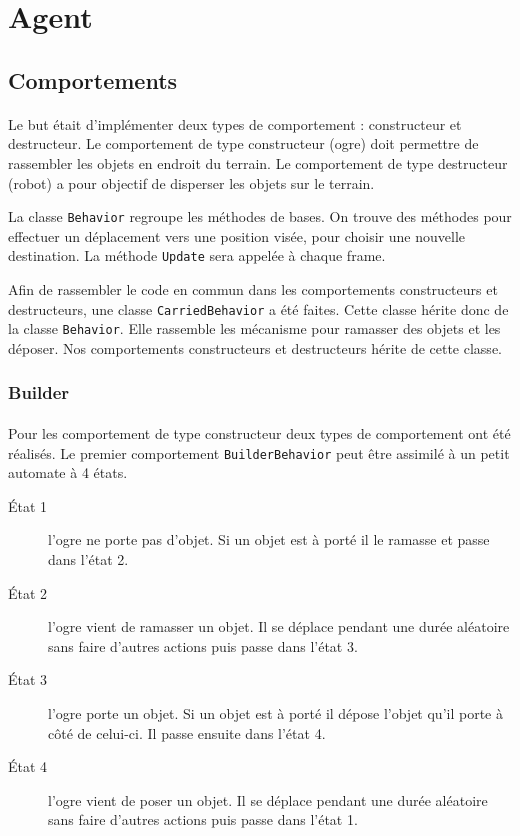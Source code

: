 \section{Agent}

\subsection{Comportements}
\paragraph{}Le but était d'implémenter deux types de comportement :
constructeur et destructeur. Le
comportement de type constructeur (ogre) doit permettre de rassembler les objets
en endroit du terrain. Le comportement de type destructeur (robot) a pour
objectif de disperser les objets sur le terrain.

La classe \texttt{Behavior} regroupe les méthodes de bases. On trouve des
méthodes pour effectuer un déplacement vers une position visée, pour choisir
une nouvelle destination. La méthode \texttt{Update} sera appelée à chaque frame.

Afin de rassembler le code en commun dans les comportements constructeurs et
destructeurs, une classe \texttt{CarriedBehavior} a été faites. Cette classe
hérite donc de la classe \texttt{Behavior}.  Elle rassemble les mécanisme pour
ramasser des objets et les déposer. Nos comportements constructeurs et destructeurs
hérite de cette classe.


\subsubsection{Builder}
\paragraph{}Pour les comportement de type constructeur deux types de comportement ont été
réalisés. Le premier comportement \texttt{BuilderBehavior} peut être assimilé à un petit automate à 4 états.


\begin{description}
    \item[\'Etat 1] l'ogre ne porte pas d'objet. Si un objet est à porté il
        le ramasse et passe dans l'état 2.
    \item[\'Etat 2] l'ogre vient de ramasser un objet. Il se déplace pendant une
        durée aléatoire sans faire d'autres actions puis passe dans l'état 3.
    \item[\'Etat 3] l'ogre porte un objet. Si un objet est à porté il
        dépose l'objet qu'il porte à côté de celui-ci. Il passe ensuite dans
        l'état 4.
    \item[\'Etat 4] l'ogre vient de poser un objet. Il se déplace pendant une
        durée aléatoire sans faire d'autres actions puis passe dans l'état 1.
\end{description}

